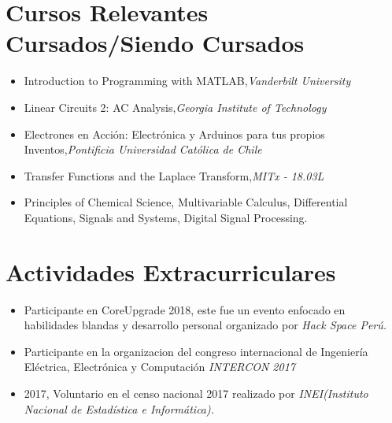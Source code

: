 \documentclass[11pt,a4paper,sans]{moderncv}        %
\begin{document}
\section{Cursos Relevantes Cursados/Siendo Cursados}
\begin{itemize}
\item{Introduction to Programming with MATLAB,\textit{Vanderbilt University}}
\item{Linear Circuits 2: AC Analysis,\textit{Georgia Institute of Technology}}
\item{Electrones en Acción: Electrónica y Arduinos para tus propios Inventos,\textit{Pontificia Universidad Católica de Chile}}
\item{Transfer Functions and the Laplace Transform,\textit{MITx - 18.03L}}
\end{itemize}
\begin{itemize}
\item {Principles of Chemical Science, Multivariable Calculus, Differential Equations, Signals and Systems, Digital Signal Processing.}
\end{itemize}
\section{Actividades Extracurriculares}
\begin{itemize}
\item{Participante en CoreUpgrade 2018, este fue un evento enfocado en habilidades blandas y desarrollo personal organizado por \textit{Hack Space Perú.}}
\item{Participante en la organizacion del congreso internacional de Ingenier\'ia El\'ectrica, Electr\'onica y Computación \textit{INTERCON 2017}}
\item{2017, Voluntario en el censo nacional 2017 realizado por }\textit{INEI(Instituto Nacional de Estadística e Informática).}
\end{itemize}
\end{document}
